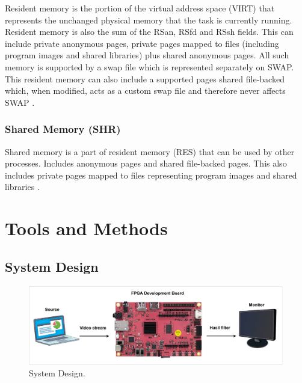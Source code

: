 Resident memory is the portion of the virtual address space (VIRT) that represents the unchanged physical memory that the task is currently running. Resident memory is also the sum of the RSan, RSfd and RSsh fields. This can include private anonymous pages, private pages mapped to files (including program images and shared libraries) plus shared anonymous pages. All such memory is supported by a swap file which is represented separately on SWAP. This resident memory can also include a supported pages shared file-backed which, when modified, acts as a custom swap file and therefore never affects SWAP \cite{manual:linux}.

\subsubsection{Shared Memory (SHR)}


Shared memory is a part of resident memory (RES) that can be used by other processes. Includes anonymous pages and shared file-backed pages. This also includes private pages mapped to files representing program images and shared libraries \cite{manual:linux}.



\section{Tools and Methods}

\subsection{System Design}
\begin{figure}[ht]
    \includegraphics[width=1\linewidth, center]{images/rancangan-sistem2.png}
    \caption{System Design.}
    \label{fig:rancangan-sistem}
\end{figure}

